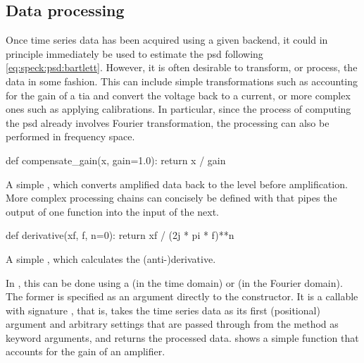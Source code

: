 \subsection{Data processing}\label{subsec:speck:software:design:processing}
Once time series data has been acquired using a given  backend, it could in principle immediately be used to estimate the \gls{psd} following \cref{eq:speck:psd:bartlett}.
However, it is often desirable to transform, or process, the data in some fashion.
This can include simple transformations such as accounting for the gain of a \gls{tia} and convert the voltage back to a current,
or more complex ones such as applying calibrations.
In particular, since the process of computing the \gls{psd} already involves Fourier transformation, the processing can also be performed in frequency space.

\begin{marginlisting}
    \begin{py}
def compensate_gain(x, gain=1.0):
    return x / gain
    \end{py}
    \caption[Simple  example]{
        A simple , which converts amplified data back to the level before amplification.
        More complex processing chains can concisely be defined with  that pipes the output of one function into the input of the next.
    }
    \label{lst:speck:procfn}
\end{marginlisting}
\begin{marginlisting}
    \begin{py}
def derivative(xf, f, n=0):
    return xf / (2j * pi * f)**n
    \end{py}
    \caption[Simple  example]{A simple , which calculates the \mbox{(anti-)}derivative.}
    \label{lst:speck:fourier_procfn}
\end{marginlisting}

In \pyspeck, this can be done using a  (in the time domain) or  (in the Fourier domain).
The former is specified as an argument directly to the  constructor.
It is a callable with signature , that is, takes the time series data as its first (positional) argument and arbitrary settings that are passed through from the  method as keyword arguments, and returns the processed data.
 shows a simple function that accounts for the gain of an amplifier.

